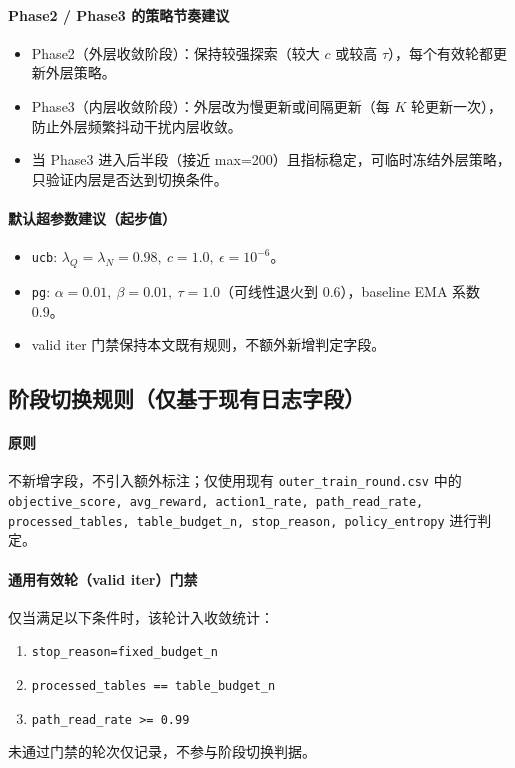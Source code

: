 \documentclass[UTF8,11pt,a4paper]{ctexart}
\begin{document}
\paragraph{Phase2 / Phase3 的策略节奏建议}
\begin{itemize}
\item Phase2（外层收敛阶段）：保持较强探索（较大 $c$ 或较高 $\tau$），每个有效轮都更新外层策略。
\item Phase3（内层收敛阶段）：外层改为慢更新或间隔更新（每 $K$ 轮更新一次），防止外层频繁抖动干扰内层收敛。
\item 当 Phase3 进入后半段（接近 max=200）且指标稳定，可临时冻结外层策略，只验证内层是否达到切换条件。
\end{itemize}

\paragraph{默认超参数建议（起步值）}
\begin{itemize}
\item \texttt{ucb}: $\lambda_Q=\lambda_N=0.98,\ c=1.0,\ \epsilon=10^{-6}$。
\item \texttt{pg}: $\alpha=0.01,\ \beta=0.01,\ \tau=1.0$（可线性退火到 0.6），baseline EMA 系数 0.9。
\item valid iter 门禁保持本文既有规则，不额外新增判定字段。
\end{itemize}

\subsection{阶段切换规则（仅基于现有日志字段）}
\paragraph{原则}
不新增字段，不引入额外标注；仅使用现有 \texttt{outer\_train\_round.csv} 中的
\texttt{objective\_score, avg\_reward, action1\_rate, path\_read\_rate, processed\_tables, table\_budget\_n, stop\_reason, policy\_entropy} 进行判定。

\paragraph{通用有效轮（valid iter）门禁}
仅当满足以下条件时，该轮计入收敛统计：
\begin{enumerate}
\item \texttt{stop\_reason=fixed\_budget\_n}
\item \texttt{processed\_tables == table\_budget\_n}
\item \texttt{path\_read\_rate >= 0.99}
\end{enumerate}
未通过门禁的轮次仅记录，不参与阶段切换判据。
\end{document}
